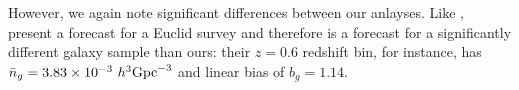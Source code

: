 However, we again note significant differences between our anlayses. Like 
\cite{yankelevich2019}, \cite{chudaykin2019} present a forecast for a Euclid survey and therefore is a forecast for a significantly different
galaxy sample than ours: their $z = 0.6$ redshift bin, for instance, has 
$\bar{n}_g = 3.83 \times 10^{-3}~h^3{\rm Gpc}^{-3}$ and linear bias of
$b_g = 1.14$. 





